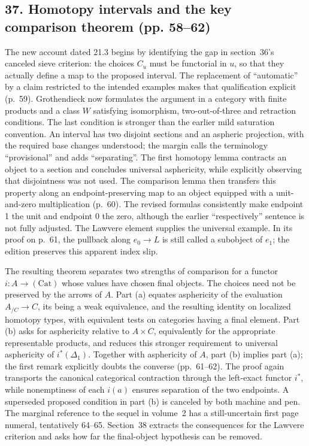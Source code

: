\subsection*{37. Homotopy intervals and the key comparison theorem (pp. 58--62)}
The new account dated 21.3 begins by identifying the gap in section~36's canceled sieve criterion: the choices $C_u$ must be functorial in $u$, so that they actually define a map to the proposed interval. The replacement of ``automatic'' by a claim restricted to the intended examples makes that qualification explicit (p.~59). Grothendieck now formulates the argument in a category with finite products and a class $W$ satisfying isomorphism, two-out-of-three and retraction conditions. The last condition is stronger than the earlier mild saturation convention. An interval has two disjoint sections and an aspheric projection, with the required base changes understood; the margin calls the terminology ``provisional'' and adds ``separating''. The first homotopy lemma contracts an object to a section and concludes universal asphericity, while explicitly observing that disjointness was not used. The comparison lemma then transfers this property along an endpoint-preserving map to an object equipped with a unit-and-zero multiplication (p.~60). The revised formulas consistently make endpoint 1 the unit and endpoint 0 the zero, although the earlier ``respectively'' sentence is not fully adjusted. The Lawvere element supplies the universal example. In its proof on p.~61, the pullback along $e_0\to L$ is still called a subobject of $e_1$; the edition preserves this apparent index slip.

The resulting theorem separates two strengths of comparison for a functor $i:A\to(\mathrm{Cat})$ whose values have chosen final objects. The choices need not be preserved by the arrows of $A$. Part (a) equates asphericity of the evaluation $A_{/C}\to C$, its being a weak equivalence, and the resulting identity on localized homotopy types, with equivalent tests on categories having a final element. Part (b) asks for asphericity relative to $A\times C$, equivalently for the appropriate representable products, and reduces this stronger requirement to universal asphericity of $i^*(\Delta_1)$. Together with asphericity of $A$, part (b) implies part (a); the first remark explicitly doubts the converse (pp.~61--62). The proof again transports the canonical categorical contraction through the left-exact functor $i^*$, while nonemptiness of each $i(a)$ ensures separation of the two endpoints. A superseded proposed condition in part (b) is canceled by both machine and pen. The marginal reference to the sequel in volume~2 has a still-uncertain first page numeral, tentatively 64--65. Section~38 extracts the consequences for the Lawvere criterion and asks how far the final-object hypothesis can be removed.

